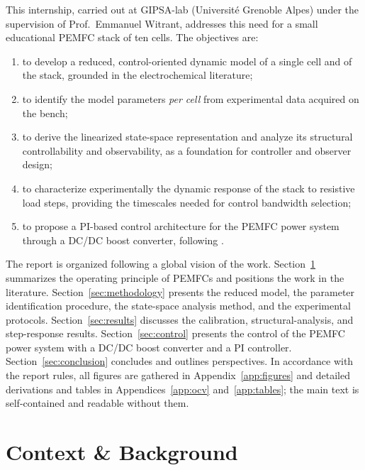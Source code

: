 \documentclass[11pt,a4paper]{article}
\begin{document}
This internship, carried out at GIPSA-lab (Universit\'e Grenoble Alpes) under the
supervision of Prof.~Emmanuel Witrant, addresses this need for a small educational
PEMFC stack of ten cells. The objectives are:
\begin{enumerate}[itemsep=1pt]
    \item to develop a reduced, control-oriented dynamic model of a single cell and
          of the stack, grounded in the electrochemical literature;
    \item to identify the model parameters \emph{per cell} from experimental data
          acquired on the bench;
    \item to derive the linearized state-space representation and analyze its
          structural controllability and observability, as a foundation for
          controller and observer design;
    \item to characterize experimentally the dynamic response of the stack to
          resistive load steps, providing the timescales needed for control
          bandwidth selection;
    \item to propose a PI-based control architecture for the PEMFC power system
          through a DC/DC boost converter, following \cite{derbeli2017}.
\end{enumerate}

The report is organized following a global vision of the work. Section~\ref{sec:context}
summarizes the operating principle of PEMFCs and positions the work in the
literature. Section~\ref{sec:methodology} presents the reduced model, the parameter
identification procedure, the state-space analysis method, and the experimental
protocols. Section~\ref{sec:results} discusses the calibration, structural-analysis,
and step-response results. Section~\ref{sec:control} presents the control of the
PEMFC power system with a DC/DC boost converter and a PI controller.
Section~\ref{sec:conclusion} concludes and outlines perspectives. In accordance with the report rules, all figures are gathered in
Appendix~\ref{app:figures} and detailed derivations and tables in
Appendices~\ref{app:ocv} and~\ref{app:tables}; the main text is self-contained and
readable without them.

\section{Context \& Background}
\label{sec:context}
\end{document}
